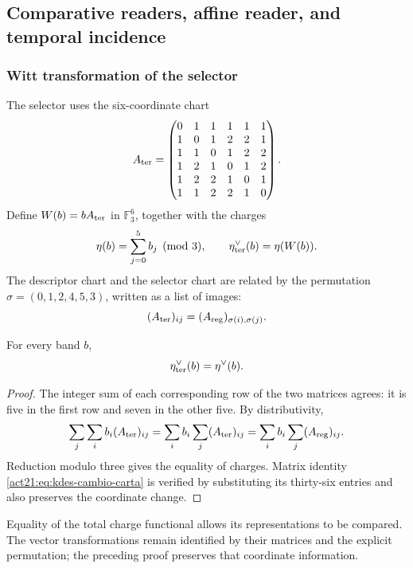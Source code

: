 \subsection{Comparative readers, affine reader, and temporal incidence}

\subsubsection{Witt transformation of the selector}

The selector uses the six-coordinate chart
\[
 A_{\rm ter}=
 \begin{pmatrix}
 0&1&1&1&1&1\\
 1&0&1&2&2&1\\
 1&1&0&1&2&2\\
 1&2&1&0&1&2\\
 1&2&2&1&0&1\\
 1&1&2&2&1&0
 \end{pmatrix}.
\]
Define $W(b)=bA_{\rm ter}$ in $\mathbb F_3^6$, together with the charges
\[
 \eta(b)=\sum_{j=0}^5 b_j\pmod3,
 \qquad\eta_{\rm ter}^\vee(b)=\eta(W(b)).
\]
The descriptor chart and the selector chart are related by the
permutation $\sigma=(0,1,2,4,5,3)$, written as a list of images:
\begin{equation}
 (A_{\rm ter})_{ij}=(A_{\rm reg})_{\sigma(i),\sigma(j)}.
 \label{act21:eq:kdes-cambio-carta}
\end{equation}

\begin{lemma}
For every band $b$,
\[
 \eta_{\rm ter}^\vee(b)=\eta^\vee(b).
\]
\end{lemma}
\begin{proof}
The integer sum of each corresponding row of the two matrices agrees:
it is five in the first row and seven in the other five. By
distributivity,
\[
 \sum_j\sum_i b_i(A_{\rm ter})_{ij}
 =\sum_i b_i\sum_j(A_{\rm ter})_{ij}
 =\sum_i b_i\sum_j(A_{\rm reg})_{ij}.
\]
Reduction modulo three gives the equality of charges. Matrix identity
\eqref{act21:eq:kdes-cambio-carta} is verified by substituting its
thirty-six entries and also preserves the coordinate change.
\end{proof}

Equality of the total charge functional allows its representations
to be compared. The vector transformations remain identified
by their matrices and the explicit permutation; the preceding proof
preserves that coordinate information.

